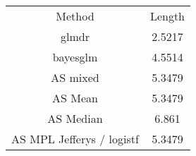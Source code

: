 \begin{center}
 \begin{tabular}{|c c|} 
 \hline
 Method & Length\\ [0.5ex] 
 glmdr & 2.5217 \\ 
 bayesglm & 4.5514 \\ 
 AS mixed & 5.3479 \\
 AS Mean & 5.3479\\
 AS Median & 6.861\\
 AS MPL Jefferys / logistf & 5.3479\\ [1ex] 
 \hline
\end{tabular}
\end{center}